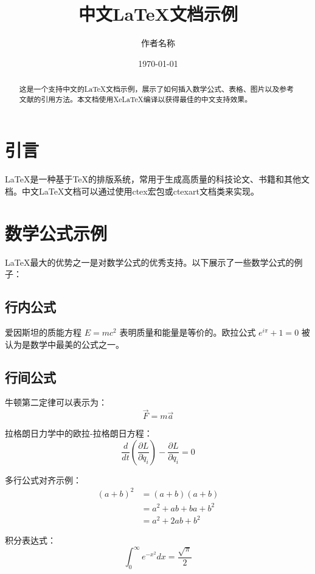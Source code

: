 \documentclass[12pt, a4paper]{ctexart} %
\title{中文\LaTeX{}文档示例}
\author{作者名称}
\date{\today}
\begin{document}
\maketitle %

\begin{abstract}
这是一个支持中文的\LaTeX{}文档示例，展示了如何插入数学公式、表格、图片以及参考文献的引用方法。本文档使用XeLaTeX编译以获得最佳的中文支持效果。
\end{abstract}

\tableofcontents %
\newpage

\section{引言}
\LaTeX{}是一种基于\TeX{}的排版系统，常用于生成高质量的科技论文、书籍和其他文档。中文\LaTeX{}文档可以通过使用ctex宏包或ctexart文档类来实现。

\section{数学公式示例}
\LaTeX{}最大的优势之一是对数学公式的优秀支持。以下展示了一些数学公式的例子：

\subsection{行内公式}
爱因斯坦的质能方程 $E=mc^2$ 表明质量和能量是等价的。欧拉公式 $e^{i\pi}+1=0$ 被认为是数学中最美的公式之一。

\subsection{行间公式}
牛顿第二定律可以表示为：
\begin{equation}
  \vec{F} = m\vec{a}
\end{equation}

拉格朗日力学中的欧拉-拉格朗日方程：
\begin{equation}
  \frac{d}{dt}\left(\frac{\partial L}{\partial \dot{q}_i}\right) - \frac{\partial L}{\partial q_i} = 0
\end{equation}

多行公式对齐示例：
\begin{align}
  (a+b)^2 &= (a+b)(a+b) \\
  &= a^2 + ab + ba + b^2 \\
  &= a^2 + 2ab + b^2
\end{align}

积分表达式：
\begin{equation}
  \int_{0}^{\infty} e^{-x^2} dx = \frac{\sqrt{\pi}}{2}
\end{equation}
\end{document}
